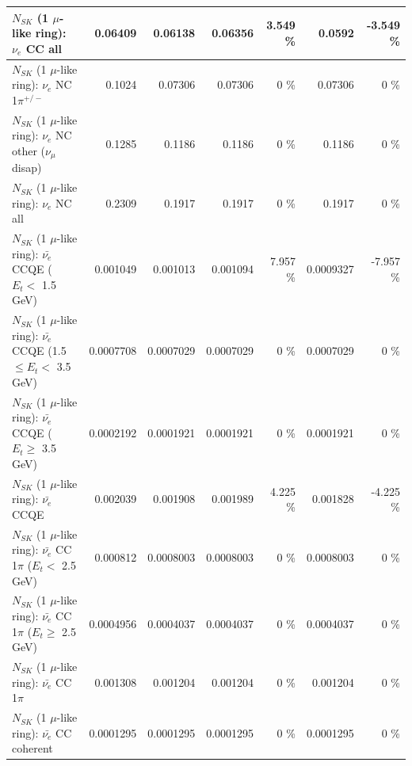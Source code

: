 \begin{table}
\begin{tabular}{| l | r | r | r  r | r  r |}
                                  $N_{SK}$ (1 $\mu$-like ring): $\nu_{e}$ CC all &         0.06409 &         0.06138 &         0.06356 &    3.549 \%  &          0.0592 &   -3.549 \%  \\ 
\hline
                           $N_{SK}$ (1 $\mu$-like ring): $\nu_e$ NC 1$\pi^{+/-}$ &          0.1024 &         0.07306 &         0.07306 &        0 \%  &         0.07306 &        0 \%  \\ 
                $N_{SK}$ (1 $\mu$-like ring): $\nu_e$ NC other ($\nu_\mu$ disap) &          0.1285 &          0.1186 &          0.1186 &        0 \%  &          0.1186 &        0 \%  \\ 
                                  $N_{SK}$ (1 $\mu$-like ring): $\nu_{e}$ NC all &          0.2309 &          0.1917 &          0.1917 &        0 \%  &          0.1917 &        0 \%  \\ 
\hline
\hline
\hline
            $N_{SK}$ (1 $\mu$-like ring): $\bar{\nu_e}$ CCQE ($E_{t} <$ 1.5 GeV) &        0.001049 &        0.001013 &        0.001094 &    7.957 \%  &       0.0009327 &   -7.957 \%  \\ 
   $N_{SK}$ (1 $\mu$-like ring): $\bar{\nu_e}$ CCQE (1.5 $\leq E_{t} <$ 3.5 GeV) &       0.0007708 &       0.0007029 &       0.0007029 &        0 \%  &       0.0007029 &        0 \%  \\ 
         $N_{SK}$ (1 $\mu$-like ring): $\bar{\nu_e}$ CCQE ($E_{t} \geq$ 3.5 GeV) &       0.0002192 &       0.0001921 &       0.0001921 &        0 \%  &       0.0001921 &        0 \%  \\ 
\hline
                                $N_{SK}$ (1 $\mu$-like ring): $\bar{\nu_e}$ CCQE &        0.002039 &        0.001908 &        0.001989 &    4.225 \%  &        0.001828 &   -4.225 \%  \\ 
\hline
       $N_{SK}$ (1 $\mu$-like ring): $\bar{\nu_e}$ CC 1$\pi$ ($E_{t} <$ 2.5 GeV) &        0.000812 &       0.0008003 &       0.0008003 &        0 \%  &       0.0008003 &        0 \%  \\ 
    $N_{SK}$ (1 $\mu$-like ring): $\bar{\nu_e}$ CC 1$\pi$ ($E_{t} \geq$ 2.5 GeV) &       0.0004956 &       0.0004037 &       0.0004037 &        0 \%  &       0.0004037 &        0 \%  \\ 
\hline
                           $N_{SK}$ (1 $\mu$-like ring): $\bar{\nu_e}$ CC 1$\pi$ &        0.001308 &        0.001204 &        0.001204 &        0 \%  &        0.001204 &        0 \%  \\ 
                         $N_{SK}$ (1 $\mu$-like ring): $\bar{\nu_e}$ CC coherent &       0.0001295 &       0.0001295 &       0.0001295 &        0 \%  &       0.0001295 &        0 \%  \\ 

\end{tabular}
\end{table}

